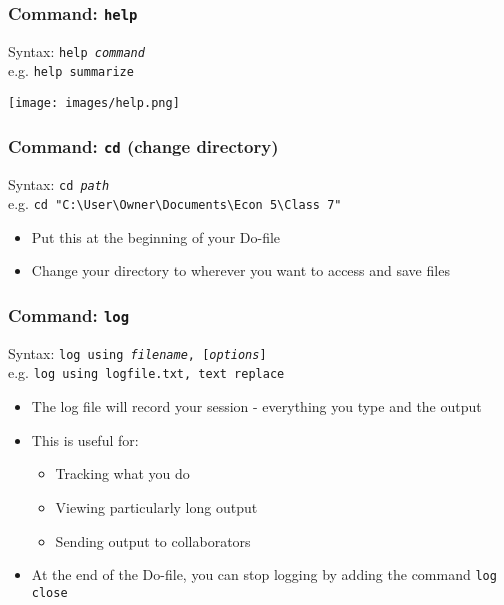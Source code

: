 \documentclass[11pt]{beamer}
\begin{document}
\begin{frame}
\frametitle{Command: \texttt{help}}
Syntax: \texttt{help \textit{command}} \\ \medskip
e.g. \texttt{help summarize}
\begin{center}
	\texttt{[image: images/help.png]}
\end{center}
\end{frame}

\begin{frame}
\frametitle{Command: \texttt{cd} (change directory)}
Syntax: \texttt{cd \textit{path}} \\ \medskip
e.g. \texttt{cd "C:\textbackslash{}User\textbackslash{}Owner\textbackslash{}Documents\textbackslash{}Econ 5\textbackslash{}Class 7"} \bigskip \pause
\begin{itemize} 
	\item Put this at the beginning of your Do-file 
	\item Change your directory to wherever you want to access and save files
\end{itemize}
\end{frame}

\begin{frame}
\frametitle{Command: \texttt{log}}
Syntax: \texttt{log using \textit{filename}, [\textit{options}]} \\ \medskip
e.g. \texttt{log using logfile.txt, text replace} \bigskip \pause
\begin{itemize} \itemsep1em
	\item The log file will record your session - everything you type and the output \pause
	\item This is useful for:
	\begin{itemize}
		\item Tracking what you do
		\item Viewing particularly long output
		\item Sending output to collaborators \pause
	\end{itemize}
	\item At the end of the Do-file, you can stop logging by adding the command \texttt{log close}
\end{itemize}
\end{frame}
\end{document}
